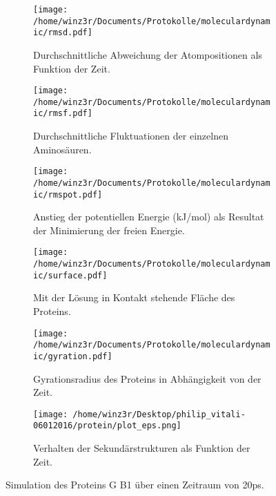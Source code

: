 \begin{figure}
\begin{subfigure}{0.45\textwidth}
\texttt{[image: /home/winz3r/Documents/Protokolle/moleculardynamic/rmsd.pdf]}\caption{\centering Durchschnittliche Abweichung der Atompositionen als Funktion der Zeit.}\label{fig:rmsd}
\end{subfigure}
\hspace{0.1cm}
\begin{subfigure}{0.45\textwidth}
\texttt{[image: /home/winz3r/Documents/Protokolle/moleculardynamic/rmsf.pdf]}\caption{\centering Durchschnittliche Fluktuationen der einzelnen Aminosäuren.}\label{fig:rmsf}
\end{subfigure}
\vspace{0.5cm}
\begin{subfigure}{0.45\textwidth}
\texttt{[image: /home/winz3r/Documents/Protokolle/moleculardynamic/rmspot.pdf]}\caption{\centering Anstieg der potentiellen Energie (kJ/mol) als Resultat der Minimierung der freien Energie.}\label{fig:rmpot}
\end{subfigure}
\hspace{1cm}
\begin{subfigure}{0.45\textwidth}
\texttt{[image: /home/winz3r/Documents/Protokolle/moleculardynamic/surface.pdf]}\caption{\centering Mit der Lösung in Kontakt stehende Fläche des Proteins.}\label{fig:rmsurf}
\end{subfigure}
\vspace{0.5cm}
\begin{subfigure}{0.45\textwidth}
\texttt{[image: /home/winz3r/Documents/Protokolle/moleculardynamic/gyration.pdf]}\caption{\centering Gyrationsradius des Proteins in Abhängigkeit von der Zeit.}\label{fig:rmgyr}
\end{subfigure}
\hspace{1cm}
\begin{subfigure}{0.45\textwidth}
\texttt{[image: /home/winz3r/Desktop/philip\_vitali-06012016/protein/plot\_eps.png]}\caption{\centering Verhalten der Sekundärstrukturen als Funktion der Zeit.}\label{fig:sekund}
\end{subfigure}
\caption{Simulation des Proteins G B1 über einen Zeitraum von 20ps.}
\end{figure}
\newpage
